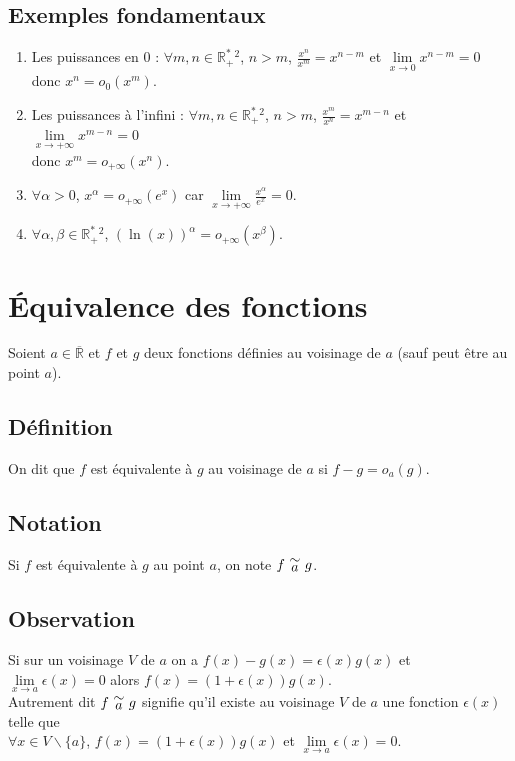\documentclass[a4paper,10pt]{book} %
\newcommand{\Rpe}{\mathbb{R}_{+}^{*}}
\newcommand{\Rb}{\overline{\mathbb{R}}}
\newcommand{\equi}[1]{\renewcommand{\arraystretch}{0.3}~\begin{matrix}\sim\\#1\end{matrix}~\renewcommand{\arraystretch}{1}}
\begin{document}
\subsection{Exemples fondamentaux}
\begin{enumerate}
\item Les puissances en 0 : $\forall m,n\in \Rpe {}^2$, $n>m$, $\frac{x^n}{x^m}=x^{n-m}$ et $\lim\limits_{x\rightarrow 0} x^{n-m}=0$ donc $x^n=o_0(x^m)$.

\item Les puissances à l'infini : $\forall m,n\in \Rpe {}^2$, $n>m$, $\frac{x^m}{x^n}=x^{m-n}$ et $\lim\limits_{x\rightarrow +\infty} x^{m-n}=0$\\donc $x^m=o_{+\infty}(x^n)$.

\smallskip

\item $\forall \alpha>0$, $x^\alpha=o_{+\infty}(e^x)$ car $\lim\limits_{x\rightarrow+\infty}\frac{x^\alpha}{e^x}=0$.

\item $\forall \alpha, \beta\in \Rpe{}^2$, $(\ln(x))^\alpha=o_{+\infty}(x^\beta)$.
\end{enumerate}

\newpage

\section{Équivalence des fonctions}\label{equivalente}
Soient $a \in \Rb$ et $f$ et $g$ deux fonctions définies au voisinage de $a$ (sauf peut être au point $a$).

\subsection{Définition}
On dit que $f$ est équivalente à $g$ au voisinage de $a$ si $f-g=o_a(g)$.

\subsection{Notation}
Si $f$ est équivalente à $g$ au point $a$, on note $f\equi{a}g$.

\subsection{Observation}
Si sur un voisinage $V$ de $a$ on a $f(x)-g(x)=\epsilon(x)g(x)$ et $\lim\limits_{x\rightarrow a}\epsilon(x)=0$ alors $f(x)=(1+\epsilon(x))g(x)$.\\
Autrement dit $f\equi{a}g$ signifie qu'il existe au voisinage $V$ de $a$ une fonction $\epsilon(x)$ telle que\\
$\forall x\in V\backslash\{a\}$, $f(x)=(1+\epsilon(x))g(x)$ et $\lim\limits_{x\rightarrow a}\epsilon(x)=0$.\\
\end{document}
